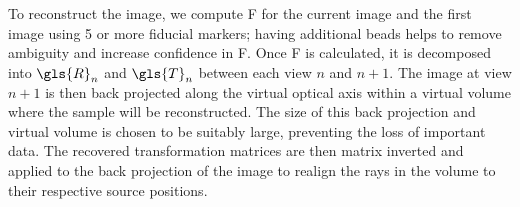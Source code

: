 \documentclass{osa-article}
\begin{document}
To reconstruct the image, we compute \gls{F} for the current image and the first image using 5 or more fiducial markers; having additional beads helps to remove ambiguity and increase confidence in \gls{F}.
Once \gls{F} is calculated, it is decomposed into \(\gls{R}_n\) and \(\gls{T}_n\) between each view \(n\) and \(n+1\).
The image at view \(n+1\) is then back projected along the virtual optical axis within a virtual volume where the sample will be reconstructed.
The size of this back projection and virtual volume is chosen to be suitably large, preventing the loss of important data.
The recovered transformation matrices are then matrix inverted and applied to the back projection of the image to realign the rays in the volume to their respective source positions. %
\end{document}
